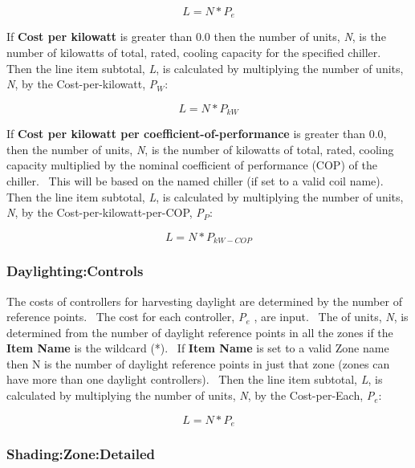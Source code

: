 \begin{equation}
L = N * {P_e}
\end{equation}

If \textbf{Cost per kilowatt} is greater than 0.0 then the number of units, \emph{N}, is the number of kilowatts of total, rated, cooling capacity for the specified chiller.~ Then the line item subtotal, \emph{L}, is calculated by multiplying the number of units, \emph{N}, by the Cost-per-kilowatt, \emph{P\(_{W}\)}:

\begin{equation}
L = N * {P_{kW}}
\end{equation}

If \textbf{Cost per kilowatt per coefficient-of-performance} is greater than 0.0, then the number of units, \emph{N}, is the number of kilowatts of total, rated, cooling capacity multiplied by the nominal coefficient of performance (COP) of the chiller.~ This will be based on the named chiller (if set to a valid coil name).~ Then the line item subtotal, \emph{L}, is calculated by multiplying the number of units, \emph{N}, by the Cost-per-kilowatt-per-COP, \emph{P\(_{P}\)}:

\begin{equation}
L = N * {P_{kW - COP}}
\end{equation}

\subsubsection{Daylighting:Controls}\label{daylightingcontrols}

The costs of controllers for harvesting daylight are determined by the number of reference points.~ The cost for each controller, \emph{P\(_{e}\)} , are input.~ The of units, \emph{N}, is determined from the number of daylight reference points in all the zones if the \textbf{Item Name} is the wildcard (*).~ If \textbf{Item Name} is set to a valid Zone name then N is the number of daylight reference points in just that zone (zones can have more than one daylight controllers).~ Then the line item subtotal, \emph{L}, is calculated by multiplying the number of units, \emph{N}, by the Cost-per-Each, \emph{P\(_{e}\)}:

\begin{equation}
L = N * {P_e}
\end{equation}

\subsubsection{Shading:Zone:Detailed}\label{shadingzonedetailed}

